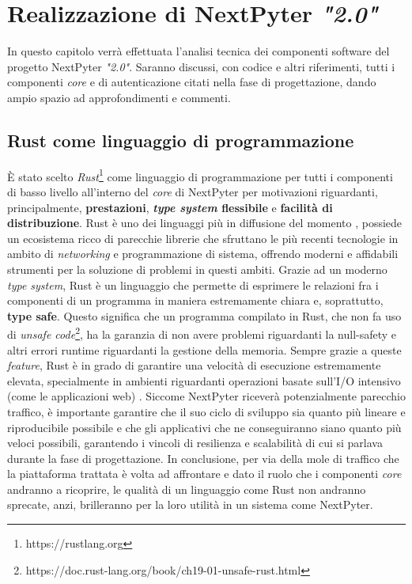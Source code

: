 \chapter{Realizzazione di NextPyter \textit{"2.0"}}
In questo capitolo verrà effettuata l'analisi tecnica dei componenti software del progetto NextPyter \textit{"2.0"}.
\newline
Saranno discussi, con codice e altri riferimenti, tutti i componenti \textit{core} e di autenticazione citati nella fase di progettazione, dando ampio spazio ad approfondimenti e commenti. 
\section{Rust come linguaggio di programmazione}
È stato scelto \textit{Rust}\footnote{https://rustlang.org} come linguaggio di programmazione per tutti i componenti di basso livello all'interno del \textit{core} di NextPyter per motivazioni riguardanti, principalmente, \textbf{prestazioni}, \textbf{\textit{type system} flessibile} e \textbf{facilità di distribuzione}. 
\newline
Rust è uno dei linguaggi più in diffusione del momento \cite{stackoverflow-2024}, possiede un ecosistema ricco di parecchie librerie che sfruttano le più recenti tecnologie in ambito di \textit{networking} e programmazione di sistema, offrendo moderni e affidabili strumenti per la soluzione di problemi in questi ambiti.
\newline
Grazie ad un moderno \textit{type system}, Rust è un linguaggio che permette di esprimere le relazioni fra i componenti di un programma in maniera estremamente chiara e, soprattutto, \textbf{type safe}. Questo significa che un programma compilato in Rust, che non fa uso di \textit{unsafe code}\footnote{https://doc.rust-lang.org/book/ch19-01-unsafe-rust.html}, ha la garanzia di non avere problemi riguardanti la null-safety e altri errori runtime riguardanti la gestione della memoria. Sempre grazie a queste \textit{feature}, Rust è in grado di garantire una velocità di esecuzione estremamente elevata, specialmente in ambienti riguardanti operazioni basate sull'I/O intensivo (come le applicazioni web) \cite{rust-perf}.
\newline
Siccome NextPyter riceverà potenzialmente parecchio traffico, è importante garantire che il suo ciclo di sviluppo sia quanto più lineare e riproducibile possibile e che gli applicativi che ne conseguiranno siano quanto più veloci possibili, garantendo i vincoli di resilienza e scalabilità di cui si parlava durante la fase di progettazione.
\newline
In conclusione, per via della mole di traffico che la piattaforma trattata è volta ad affrontare e dato il ruolo che i componenti \textit{core} andranno a ricoprire, le qualità di un linguaggio come Rust non andranno sprecate, anzi, brilleranno per la loro utilità in un sistema come NextPyter.
